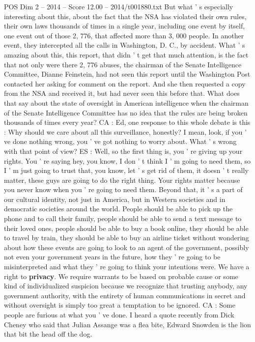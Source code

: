 \begin{textsample}{POS Dim 2 – 2014 – Score 12.00 – 2014/t001880.txt}
But what ' s especially interesting about this, about the fact that the NSA has violated their own rules, their own laws thousands of times in a single year, including one event by itself, one event out of those 2, 776, that affected more than 3, 000 people.
In another event, they intercepted all the calls in Washington, D.
C., by accident.
What ' s amazing about this, this report, that didn ' t get that much attention, is the fact that not only were there 2, 776 abuses, the chairman of the Senate Intelligence Committee, Dianne Feinstein, had not seen this report until the Washington Post contacted her asking for comment on the report.
And she then requested a copy from the NSA and received it, but had never seen this before that.
What does that say about the state of oversight in American intelligence when the chairman of the Senate Intelligence Committee has no idea that the rules are being broken thousands of times every year?
CA : Ed, one response to this whole debate is this : Why should we care about all this surveillance, honestly?
I mean, look, if you ' ve done nothing wrong, you ' ve got nothing to worry about.
What ' s wrong with that point of view?
ES : Well, so the first thing is, you ' re giving up your rights.
You ' re saying hey, you know, I don ' t think I ' m going to need them, so I ' m just going to trust that, you know, let ' s get rid of them, it doesn ' t really matter, these guys are going to do the right thing.
Your rights matter because you never know when you ' re going to need them.
Beyond that, it ' s a part of our cultural identity, not just in America, but in Western societies and in democratic societies around the world.
People should be able to pick up the phone and to call their family, people should be able to send a text message to their loved ones, people should be able to buy a book online, they should be able to travel by train, they should be able to buy an airline ticket without wondering about how these events are going to look to an agent of the government, possibly not even your government years in the future, how they ' re going to be misinterpreted and what they ' re going to think your intentions were.
We have a right to \textbf{privacy}.
We require warrants to be based on probable cause or some kind of individualized suspicion because we recognize that trusting anybody, any government authority, with the entirety of human communications in secret and without oversight is simply too great a temptation to be ignored.
CA : Some people are furious at what you ' ve done.
I heard a quote recently from Dick Cheney who said that Julian Assange was a flea bite, Edward Snowden is the lion that bit the head off the dog.

\end{textsample}
